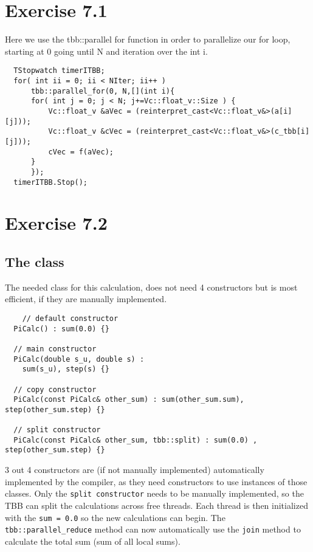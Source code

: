 \documentclass[a4paper]{article}
\begin{document}
\section*{Exercise 7.1}
Here we use the tbb::parallel for function in order to parallelize our for loop, starting at 0 going until N and iteration over the int i.
\begin{lstlisting}
  TStopwatch timerITBB;
  for( int ii = 0; ii < NIter; ii++ )
      tbb::parallel_for(0, N,[](int i){
      for( int j = 0; j < N; j+=Vc::float_v::Size ) {
          Vc::float_v &aVec = (reinterpret_cast<Vc::float_v&>(a[i][j]));
          Vc::float_v &cVec = (reinterpret_cast<Vc::float_v&>(c_tbb[i][j]));
          cVec = f(aVec);
      }
      });
  timerITBB.Stop();
\end{lstlisting}
\section*{Exercise 7.2}
\subsection*{The class}
The needed class for this calculation, does not need 4 constructors but is most efficient, if they are manually implemented.
\begin{lstlisting}
    // default constructor
  PiCalc() : sum(0.0) {}

  // main constructor 
  PiCalc(double s_u, double s) :
    sum(s_u), step(s) {}

  // copy constructor
  PiCalc(const PiCalc& other_sum) : sum(other_sum.sum), step(other_sum.step) {}

  // split constructor
  PiCalc(const PiCalc& other_sum, tbb::split) : sum(0.0) , step(other_sum.step) {} 
\end{lstlisting}
3 out 4 constructors are (if not manually implemented) automatically implemented by the compiler, as they need constructors to use instances of those classes. Only the \lstinline{split constructor} needs to be manually implemented, so the TBB can split the calculations across free threads.
Each thread is then initialized with the \lstinline{sum = 0.0} so the new calculations can begin. The \lstinline{tbb::parallel_reduce} method can now automatically use the \lstinline{join} method to calculate the total sum (sum of all local sums).
\end{document}
